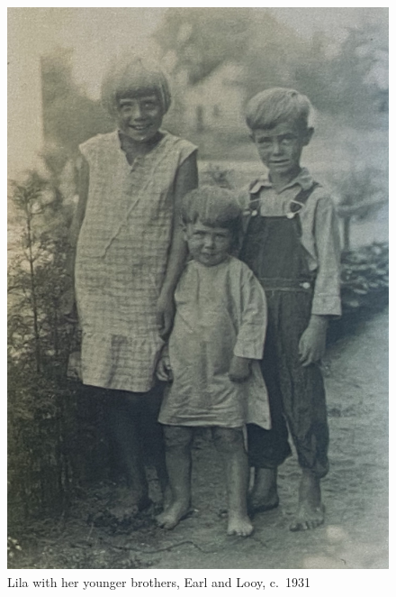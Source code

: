\documentclass[
  letterpaper,
]{book}
\begin{document}
\begin{figure}[H]

{\centering \includegraphics[width=0.7\linewidth,height=\textheight,keepaspectratio]{images/Akou02.JPG}

}

\caption{Lila with her younger brothers, Earl and Looy, c.~1931}

\end{figure}%
\end{document}
